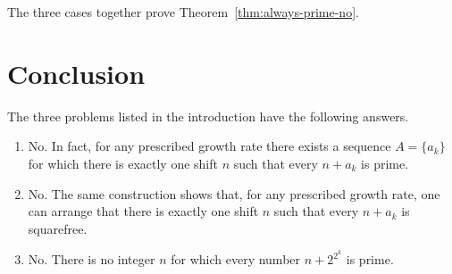\documentclass[11pt]{article}
\newif\ifuseenumitem
\newenvironment{arabicparts}
{\ifuseenumitem
  \begin{enumerate}[label=(\arabic*)]\else
    \begin{enumerate}\renewcommand{\labelenumi}{(\arabic{enumi})}\fi}
        {
      \end{enumerate}}
\theoremstyle{remark}
\begin{document}
        The three cases together prove Theorem~\ref{thm:always-prime-no}.

        \section{Conclusion}

        The three problems listed in the introduction have the following answers.

        \begin{arabicparts}
        \item No. In fact, for any prescribed growth rate there exists a sequence $A=\{a_k\}$ for which there is exactly one shift $n$ such that every $n+a_k$ is prime.
        \item No. The same construction shows that, for any prescribed growth rate, one can arrange that there is exactly one shift $n$ such that every $n+a_k$ is squarefree.
        \item No. There is no integer $n$ for which every number $n+2^{2^k}$ is prime.
        \end{arabicparts}

        
\end{document}
